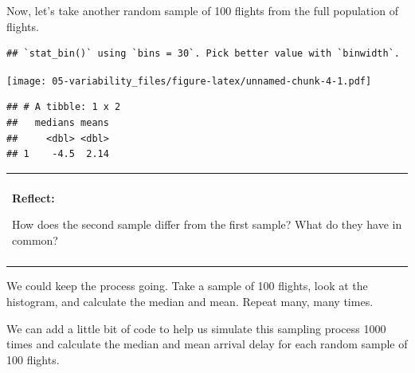 \documentclass[
]{book}
\newenvironment{Shaded}{\begin{snugshade}}{\end{snugshade}}
\newcommand{\CommentTok}[1]{\textcolor[rgb]{0.56,0.35,0.01}{\textit{#1}}}
\newcommand{\DataTypeTok}[1]{\textcolor[rgb]{0.13,0.29,0.53}{#1}}
\newcommand{\DecValTok}[1]{\textcolor[rgb]{0.00,0.00,0.81}{#1}}
\newcommand{\KeywordTok}[1]{\textcolor[rgb]{0.13,0.29,0.53}{\textbf{#1}}}
\newcommand{\NormalTok}[1]{#1}
\newcommand{\OperatorTok}[1]{\textcolor[rgb]{0.81,0.36,0.00}{\textbf{#1}}}
\newcommand{\StringTok}[1]{\textcolor[rgb]{0.31,0.60,0.02}{#1}}
\newenvironment{reflect}
{
    \begin{center}
    
    \begin{tabular}{|p{0.8\textwidth}|}
    \rowcolor{LightBlue}
    \hline\\
    \rowcolor{LightBlue}
    \textbf{Reflect:}
}
{
    \\\rowcolor{LightBlue}
    \\\hline
    \end{tabular} 
    \end{center}
}
\begin{document}
Now, let's take another random sample of 100 flights from the full population of flights.

\begin{Shaded}
\end{Shaded}

\begin{verbatim}
## `stat_bin()` using `bins = 30`. Pick better value with `binwidth`.
\end{verbatim}

\texttt{[image: 05-variability\_files/figure-latex/unnamed-chunk-4-1.pdf]}

\begin{Shaded}
\end{Shaded}

\begin{verbatim}
## # A tibble: 1 x 2
##   medians means
##     <dbl> <dbl>
## 1    -4.5  2.14
\end{verbatim}

\begin{reflect}
How does the second sample differ from the first sample? What do they
have in common?
\end{reflect}

We could keep the process going. Take a sample of 100 flights, look at the histogram, and calculate the median and mean. Repeat many, many times.

We can add a little bit of code to help us simulate this sampling process 1000 times and calculate the median and mean arrival delay for each random sample of 100 flights.
\end{document}
